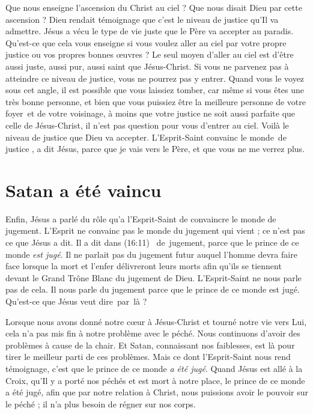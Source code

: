 Que nous enseigne l'ascension du Christ au ciel ?
 Que nous disait Dieu par cette ascension ?
 Dieu rendait témoignage que c'est le niveau de justice qu'Il va admettre.
 Jésus a vécu le type de vie juste que le Père va accepter au paradis.
 Qu'est-ce que cela vous enseigne si vous voulez aller au ciel par votre propre
 justice ou vos propres bonnes œuvres ?
 Le seul moyen d'aller au ciel est d'être aussi juste, aussi pur,
 aussi saint que Jésus-Christ.
 Si vous ne parvenez pas à atteindre ce niveau de justice,
 vous ne pourrez pas y entrer. Quand vous le voyez sous cet angle,
 il est possible que vous laissiez tomber, car même si vous êtes une très bonne
 personne, et bien que vous puissiez être la meilleure personne de votre foyer~et %
 de votre voisinage, à moins que votre justice ne soit aussi parfaite
 que celle de Jésus-Christ, il n'est pas question pour vous d'entrer au ciel.
 Voilà le niveau de justice que Dieu va accepter.
 \Og L'Esprit-Saint convainc le monde~de justice \Fg{}, a dit Jésus,
 \Og parce que je vais vers le Père, et que vous ne me verrez plus. \Fg{}


\section{Satan a \'et\'e vaincu}

Enfin, Jésus a parlé du rôle qu'a l'Esprit-Saint de convaincre le monde de jugement.
 L'Esprit ne convainc pas le monde du jugement qui vient ;
 ce n'est pas ce que Jésus a dit. Il a dit dans (16:11)\frcolon{}
 \Og [...]~de~jugement, parce que le prince de ce monde \emph{est jugé}. \Fg{}
 Il ne parlait pas du jugement futur auquel l'homme devra faire face
 lorsque la mort et l'enfer délivreront leurs morts afin qu'ils se tiennent
 devant le Grand Trône Blanc du jugement de Dieu.
 L'Esprit-Saint ne nous parle pas de cela. Il nous parle du jugement
 \Og parce que le prince de ce monde est jugé. \Fg{}
 Qu'est-ce que Jésus veut dire~par~là ?

Lorsque nous avons donné notre cœur à Jésus-Christ et tourné notre vie
 vers Lui, cela n'a pas mis fin à notre problème avec le péché.
 Nous continuons d'avoir des problèmes à cause de la chair.
 Et Satan, connaissant nos faiblesses, est là pour
 tirer le meilleur parti de ces problèmes. Mais ce dont l'Esprit-Saint nous rend témoignage,
 c'est que le prince de ce monde \emph{a été jugé}.
 Quand Jésus est allé à la Croix, qu'Il y a porté nos péchés et est mort
 à notre place, le prince de ce monde a été jugé,
 afin que par notre relation à Christ, nous puissions avoir le pouvoir
 sur le péché ; il n'a plus besoin de régner sur nos corps.

